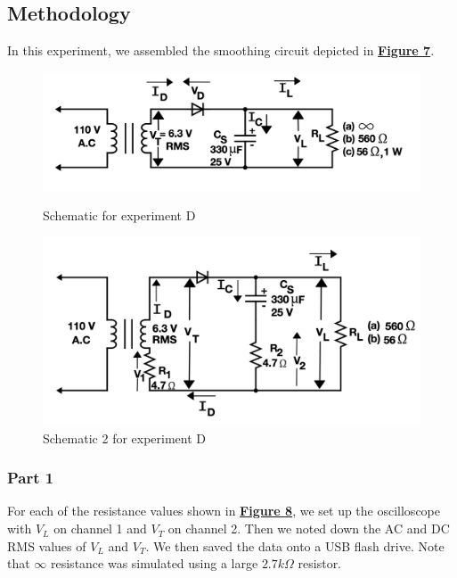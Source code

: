 \documentclass[
	letterpaper
	12pt
]{template}
\begin{document}
\subsection{Methodology}
In this experiment, we assembled the smoothing circuit depicted in \textbf{\hyperref[apparatus::D]{Figure 7}}.
\begin{figure}[H]\label{apparatus::D}
	\begin{minipage}[c]{0.45\textwidth}
		\centering
		\includegraphics[width=\textwidth]{figures/D/schematic.png}
		\caption{Schematic for experiment D \\ \protect\cite{labManual}}
	\end{minipage}
	\hfill
	\begin{minipage}[c]{0.45\textwidth}
		\centering
		\includegraphics[width=\textwidth]{figures/D/schematic2.png}
		\caption{Schematic 2 for experiment D \\ \protect\cite{labManual}}
	\end{minipage}
\end{figure}
\subsubsection{Part 1}\label{method::D1}
For each of the resistance values shown in \textbf{\hyperref[apparatus::D]{Figure 8}}, we set up the oscilloscope with $V_L$ on channel 1 and $V_T$ on channel 2. Then we noted down the AC and DC RMS values of $V_L$ and $V_T$. We then saved the data onto a USB flash drive. Note that $\infty$ resistance was simulated using a large $2.7k\Omega$ resistor.
\end{document}
